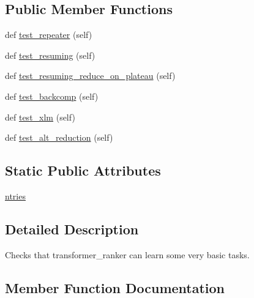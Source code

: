 \subsection*{Public Member Functions}
\begin{DoxyCompactItemize}
\item 
def \hyperlink{classtests_1_1test__transformers_1_1TestTransformerRanker_a386da89601a1778da3844cf901df3697}{test\+\_\+repeater} (self)
\item 
def \hyperlink{classtests_1_1test__transformers_1_1TestTransformerRanker_a55dff1bae7f3fef267f2437423ee008f}{test\+\_\+resuming} (self)
\item 
def \hyperlink{classtests_1_1test__transformers_1_1TestTransformerRanker_aaaf8b461c4f6460c770c1717c6cf9f5c}{test\+\_\+resuming\+\_\+reduce\+\_\+on\+\_\+plateau} (self)
\item 
def \hyperlink{classtests_1_1test__transformers_1_1TestTransformerRanker_a63dd66de96a7eee38a2bf477bd27441f}{test\+\_\+backcomp} (self)
\item 
def \hyperlink{classtests_1_1test__transformers_1_1TestTransformerRanker_a2a4671741d853fa9ff5bf484ec98487c}{test\+\_\+xlm} (self)
\item 
def \hyperlink{classtests_1_1test__transformers_1_1TestTransformerRanker_a511fbe2d896e28baff21f5c9e7f0b0b4}{test\+\_\+alt\+\_\+reduction} (self)
\end{DoxyCompactItemize}
\subsection*{Static Public Attributes}
\begin{DoxyCompactItemize}
\item 
\hyperlink{classtests_1_1test__transformers_1_1TestTransformerRanker_ac580716d99f1d6e925acdf3deee22def}{ntries}
\end{DoxyCompactItemize}


\subsection{Detailed Description}
\begin{DoxyVerb}Checks that transformer_ranker can learn some very basic tasks.
\end{DoxyVerb}
 

\subsection{Member Function Documentation}
\mbox{\label{classtests_1_1test__transformers_1_1TestTransformerRanker_a511fbe2d896e28baff21f5c9e7f0b0b4}} 
